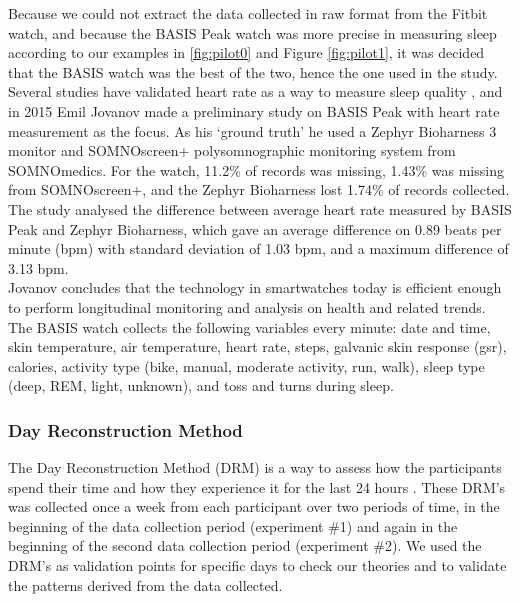 \documentclass[12pt]{article} %
\begin{document}
Because we could not extract the data collected in raw format from the Fitbit watch, and because the BASIS Peak watch was more precise in measuring sleep according to our examples in \ref{fig:pilot0} and Figure \ref{fig:pilot1}, it was decided that the BASIS watch was the best of the two, hence the one used in the study. \\

Several studies have validated heart rate as a way to measure sleep quality \cite{heartratesleep}\cite{heartrateagain}, and in 2015 Emil Jovanov \cite{EmilBasis} made a preliminary study on BASIS Peak with heart rate measurement as the focus. As his `ground truth' he used a Zephyr Bioharness 3 monitor and SOMNOscreen+ polysomnographic monitoring system from SOMNOmedics. For the watch, 11.2\% of records was missing, 1.43\% was missing from SOMNOscreen+, and the Zephyr Bioharness lost 1.74\% of records collected. The study analysed the difference between average heart rate measured by BASIS Peak and Zephyr Bioharness, which gave an average difference on 0.89 beats per minute (bpm) with standard deviation of 1.03 bpm, and a maximum difference of 3.13 bpm. \\

Jovanov concludes that the technology in smartwatches today is efficient enough to perform longitudinal monitoring and analysis on health and related trends. \\

The BASIS watch collects the following variables every minute: date and time, skin temperature, air temperature, heart rate, steps, galvanic skin response (gsr), calories, activity type (bike, manual, moderate activity, run, walk), sleep type (deep, REM, light, unknown), and toss and turns during sleep. 

\subsubsection{Day Reconstruction Method}
The Day Reconstruction Method (DRM) is a way to assess how the participants spend their time and how they experience it for the last 24 hours \cite{drm}. These DRM's was collected once a week from each participant over two periods of time, in the beginning of the data collection period (experiment \#1) and again in the beginning of the second data collection period (experiment \#2). We used the DRM's as validation points for specific days to check our theories and to validate the patterns derived from the data collected. \\
\end{document}

